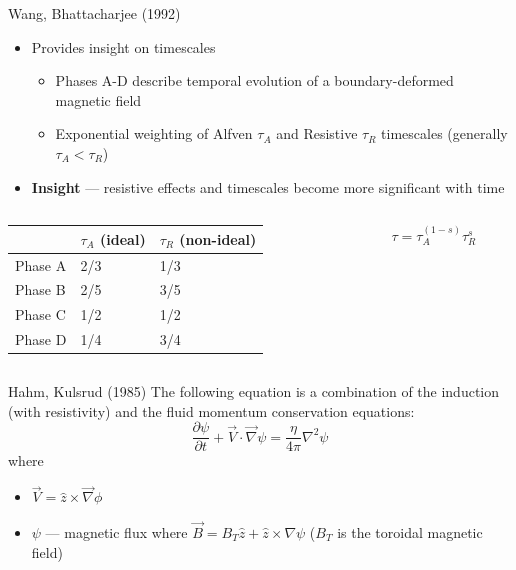 \documentclass[compress]{beamer}
\begin{document}
\begin{frame}{Wang, Bhattacharjee (1992) \cite{wangbhattacherjee}}
   \begin{itemize}
       \item Provides insight on timescales
           \begin{itemize}
               \item Phases A-D describe temporal evolution of a boundary-deformed magnetic field
               \item Exponential weighting of Alfven $\tau_A$ and Resistive $\tau_R$ timescales (generally $\tau_A < \tau_R$)
           \end{itemize}
        \item {\bf Insight} --- resistive effects and timescales become more significant with time
   \end{itemize} 
   \vspace{1em}
   \begin{columns}
       \begin{column}{0.6\textwidth}
           \begin{tabular}{|l|l|l|}
                \hline
                    & $\tau_A$ (ideal) & $\tau_R$ (non-ideal) \\
                \hline
                    Phase A & 2/3 & 1/3 \\
                \hline
                    Phase B & 2/5 & 3/5 \\
                \hline
                    Phase C & 1/2 & 1/2 \\
                \hline
                    Phase D & 1/4 & 3/4 \\
                \hline
            \end{tabular}
       \end{column}

       \begin{column}{0.4\textwidth}
           \begin{equation}
                \tau=\tau_A^{(1-s)}\tau_R^s
           \end{equation} 
       \end{column}
   \end{columns}
\end{frame}

\begin{frame}{Hahm, Kulsrud (1985) \cite{hahmkulsrud}}
    The following equation is a combination of the induction (with resistivity) and the fluid momentum conservation equations:
    \begin{equation}
        \label{eq:hk15}
        \frac{\partial \psi}{\partial t} + \vec{V}\cdot \vec{\nabla}\psi=\frac{\eta}{4\pi}\nabla^2 \psi
    \end{equation} 
    where
    \begin{itemize}
        \item $\vec{V}=\hat{z}\times \vec{\nabla}\phi$
        \item $\psi$ --- magnetic flux where $\vec{B}=B_T \hat{z}+\hat{z}\times \nabla \psi$ ($B_T$ is the toroidal magnetic field)
    \end{itemize}
\end{frame}
\end{document}
